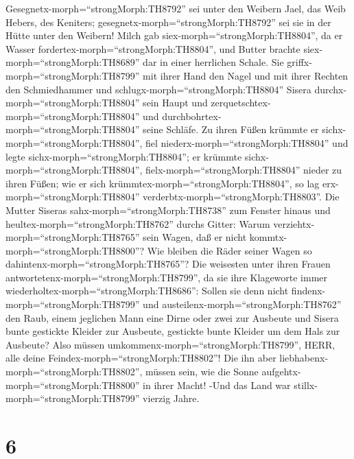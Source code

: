 Gesegnetx-morph=``strongMorph:TH8792'' sei unter den Weibern Jael, das
Weib Hebers, des Keniters; gesegnetx-morph=``strongMorph:TH8792'' sei
sie in der Hütte unter den Weibern!  Milch gab
siex-morph=``strongMorph:TH8804'', da er Wasser
fordertex-morph=``strongMorph:TH8804'', und Butter brachte
siex-morph=``strongMorph:TH8689'' dar in einer herrlichen Schale.
 Sie griffx-morph=``strongMorph:TH8799'' mit ihrer Hand den
Nagel und mit ihrer Rechten den Schmiedhammer und
schlugx-morph=``strongMorph:TH8804'' Sisera
durchx-morph=``strongMorph:TH8804'' sein Haupt und
zerquetschtex-morph=``strongMorph:TH8804'' und
durchbohrtex-morph=``strongMorph:TH8804'' seine Schläfe. 
Zu ihren Füßen krümmte er sichx-morph=``strongMorph:TH8804'', fiel
niederx-morph=``strongMorph:TH8804'' und legte
sichx-morph=``strongMorph:TH8804''; er krümmte
sichx-morph=``strongMorph:TH8804'', fielx-morph=``strongMorph:TH8804''
nieder zu ihren Füßen; wie er sich
krümmtex-morph=``strongMorph:TH8804'', so lag
erx-morph=``strongMorph:TH8804'' verderbtx-morph=``strongMorph:TH8803''.
 Die Mutter Siseras sahx-morph=``strongMorph:TH8738'' zum
Fenster hinaus und heultex-morph=``strongMorph:TH8762'' durchs Gitter:
Warum verziehtx-morph=``strongMorph:TH8765'' sein Wagen, daß er nicht
kommtx-morph=``strongMorph:TH8800''? Wie bleiben die Räder seiner Wagen
so dahintenx-morph=``strongMorph:TH8765''?  Die weisesten
unter ihren Frauen antwortetenx-morph=``strongMorph:TH8799'', da sie
ihre Klageworte immer wiederholtex-morph=``strongMorph:TH8686'':
 Sollen sie denn nicht findenx-morph=``strongMorph:TH8799''
und austeilenx-morph=``strongMorph:TH8762'' den Raub, einem jeglichen
Mann eine Dirne oder zwei zur Ausbeute und Sisera bunte gestickte
Kleider zur Ausbeute, gestickte bunte Kleider um dem Hals zur Ausbeute?
 Also müssen umkommenx-morph=``strongMorph:TH8799'', HERR,
alle deine Feindex-morph=``strongMorph:TH8802''! Die ihn aber
liebhabenx-morph=``strongMorph:TH8802'', müssen sein, wie die Sonne
aufgehtx-morph=``strongMorph:TH8800'' in ihrer Macht! -Und das Land war
stillx-morph=``strongMorph:TH8799'' vierzig Jahre.

\hypertarget{section-5}{%
\section{6}\label{section-5}}

